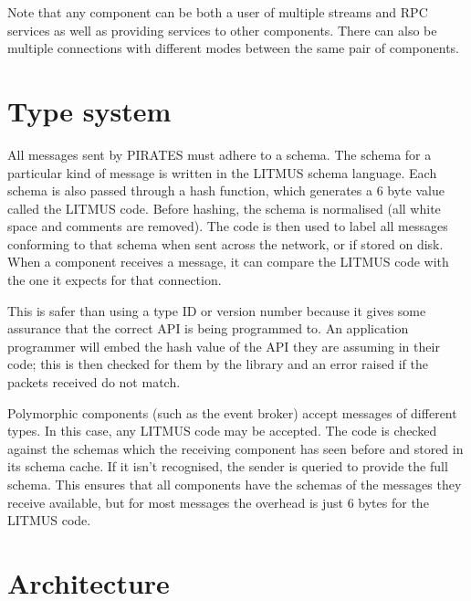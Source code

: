 \documentclass[12pt,a4paper,twoside]{article}
\renewcommand{\_}{\texttt{\symbol{95}}}
\begin{document}
Note that any component can be both a user of multiple
streams and RPC services as well as providing services to other components.
There can also be multiple connections with different modes between
the same pair of components.

\section{Type system}

All messages sent by PIRATES must adhere to a schema. The schema for
a particular kind of message is written in the LITMUS schema language.
Each schema is also passed through a hash function, which generates
a 6 byte value called the LITMUS code.
Before hashing, the schema is normalised (all white
space and comments are removed).
The code is then used to label all
messages conforming to that schema when sent across the network,
or if stored on disk. When a component receives a message, it
can compare the LITMUS code with the one it expects for that connection.

This is safer than using a type ID or version number because it gives
some assurance that the correct API is being programmed to.
An application programmer will embed the hash value of the
API they are assuming in their code; this is then checked for
them by the library and an error raised if the packets
received do not match.

Polymorphic components (such as the event broker) accept messages
of different types. In this case, any LITMUS code may be
accepted. The code is checked against the schemas which the
receiving component has seen before and stored in its schema cache.
If it isn't recognised, the sender is queried to provide the full
schema. This ensures that all components have the schemas of
the messages they receive available, but for most messages the
overhead is just 6 bytes for the LITMUS code.

\section{Architecture}
\end{document}

